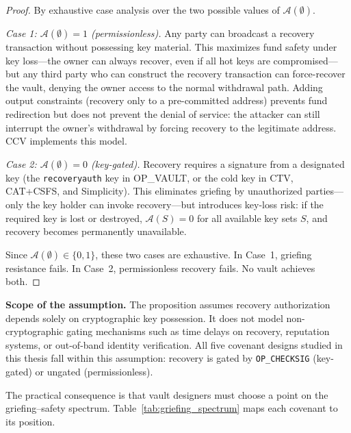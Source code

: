 \begin{proof}
By exhaustive case analysis over the two possible values of
$\mathcal{A}(\emptyset)$.

\emph{Case 1: $\mathcal{A}(\emptyset) = 1$ (permissionless).} Any party can
broadcast a recovery transaction without possessing key material. This maximizes
fund safety under key loss---the owner can always recover, even if all hot keys are
compromised---but any third party who can construct the recovery transaction can
force-recover the vault, denying the owner access to the normal withdrawal path.
Adding output constraints (recovery only to a pre-committed address) prevents fund
redirection but does not prevent the denial of service: the attacker can still
interrupt the owner's withdrawal by forcing recovery to the legitimate address.
CCV implements this model.

\emph{Case 2: $\mathcal{A}(\emptyset) = 0$ (key-gated).} Recovery requires a
signature from a designated key (the \texttt{recoveryauth} key in OP\_VAULT, or the
cold key in CTV, CAT+CSFS, and Simplicity). This eliminates griefing by unauthorized
parties---only the key holder can invoke recovery---but introduces key-loss risk: if
the required key is lost or destroyed, $\mathcal{A}(S) = 0$ for all available key
sets $S$, and recovery becomes permanently unavailable.

Since $\mathcal{A}(\emptyset) \in \{0, 1\}$, these two cases are exhaustive. In
Case~1, griefing resistance fails. In Case~2, permissionless recovery fails. No
vault achieves both. \qedhere
\end{proof}

\noindent
\textbf{Scope of the assumption.} The proposition assumes recovery authorization
depends solely on cryptographic key possession. It does not model non-cryptographic
gating mechanisms such as time delays on recovery, reputation systems, or
out-of-band identity verification. All five covenant designs studied in this thesis
fall within this assumption: recovery is gated by \texttt{OP\_CHECKSIG} (key-gated)
or ungated (permissionless).

The practical consequence is that vault designers must choose a point on the
griefing--safety spectrum. Table~\ref{tab:griefing_spectrum} maps each covenant to
its position.

